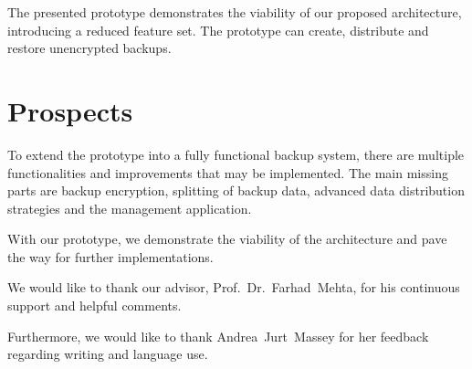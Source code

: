 The presented prototype demonstrates the viability of our proposed architecture, introducing a reduced feature set. The prototype can create, distribute and restore unencrypted backups.

\section*{Prospects}

To extend the prototype into a fully functional backup system, there are multiple functionalities and improvements that may be implemented. The main missing parts are backup encryption, splitting of backup data, advanced data distribution strategies and the management application.

With our prototype, we demonstrate the viability of the architecture and pave the way for further implementations.



\begin{acknowledgements}
\addchaptertocentry{\acknowledgementname} %
We would like to thank our advisor, Prof.~Dr.~Farhad~Mehta, for his continuous support and helpful comments.

Furthermore, we would like to thank Andrea~Jurt~Massey for her feedback regarding writing and language use.

\end{acknowledgements}


\setcounter{tocdepth}{2}
\tableofcontents %




